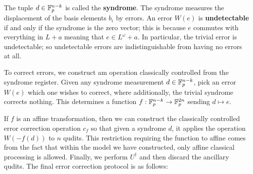 The tuple $d \in \mathbb{F}_p^{n-k}$ is called the {\bf syndrome}. The syndrome measures the displacement of the basis elements $b_i$ by errors.
An error $W(e)$ is {\bf undetectable} if and only if the syndrome is the zero vector; this is because $e$ commutes with everything in $L+a$ meaning that $e \in L^\omega+a$.  In particular, the trivial error is undetectable; so undetectable errors are indistinguishable from having no errors at all.

To correct errors, we construct am operation classically controlled from the syndrome register.
Given any syndrome measurement $d\in \mathbb{F}_p^{n-k}$, pick an error $W(e)$ which one wishes to correct, where additionally, the trivial syndrome corrects nothing.  This determines a function $f:\mathbb{F}_p^{n-k}\to\mathbb{F}_p^{2n}$ sending $d\mapsto e$.


If $f$ is an affine transformation, then we can construct the classically controlled error correction operation $c_f$ so that given a syndrome $d$, it applies the operation $W(-f(d))$ to $n$ qudits.  This restriction requiring the function to affine comes from the fact that within the model we have constructed, only affine classical processing is allowed. Finally, we perform $U^\dag$ and then discard the ancillary qudits. The final error correction protocol is as follows:
